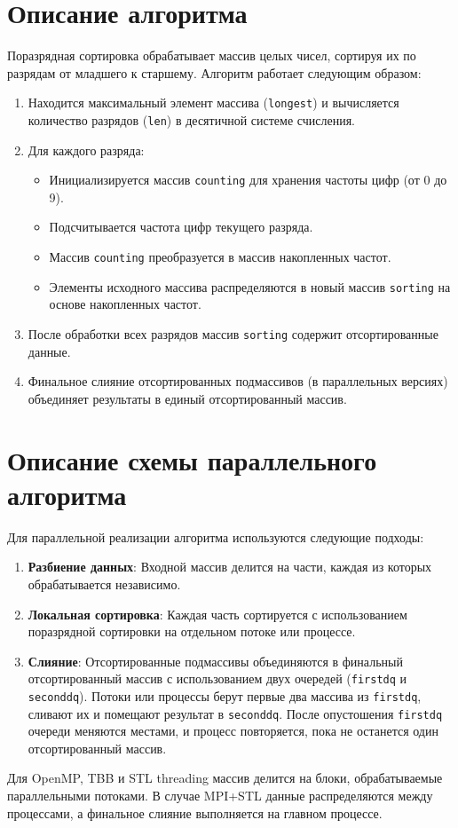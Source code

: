 \documentclass[a4paper,12pt]{article}
\begin{document}
\section{Описание алгоритма}
\sloppy
Поразрядная сортировка обрабатывает массив целых чисел, сортируя их по разрядам от младшего к старшему. Алгоритм работает следующим образом:
\begin{enumerate}
    \item Находится максимальный элемент массива (\texttt{longest}) и вычисляется количество разрядов (\texttt{len}) в десятичной системе счисления.
    \item Для каждого разряда:
        \begin{itemize}
            \item Инициализируется массив \texttt{counting} для хранения частоты цифр (от 0 до 9).
            \item Подсчитывается частота цифр текущего разряда.
            \item Массив \texttt{counting} преобразуется в массив накопленных частот.
            \item Элементы исходного массива распределяются в новый массив \texttt{sorting} на основе накопленных частот.
        \end{itemize}
    \item После обработки всех разрядов массив \texttt{sorting} содержит отсортированные данные.
    \item Финальное слияние отсортированных подмассивов (в параллельных версиях) объединяет результаты в единый отсортированный массив.
\end{enumerate}
\fussy

\section{Описание схемы параллельного алгоритма}
Для параллельной реализации алгоритма используются следующие подходы:
\begin{enumerate}
    \item \textbf{Разбиение данных}: Входной массив делится на части, каждая из которых обрабатывается независимо.
    \item \textbf{Локальная сортировка}: Каждая часть сортируется с использованием поразрядной сортировки на отдельном потоке или процессе.
    \item \textbf{Слияние}: Отсортированные подмассивы объединяются в финальный отсортированный массив с использованием двух очередей (\texttt{firstdq} и \texttt{seconddq}). Потоки или процессы берут первые два массива из \texttt{firstdq}, сливают их и помещают результат в \texttt{seconddq}. После опустошения \texttt{firstdq} очереди меняются местами, и процесс повторяется, пока не останется один отсортированный массив.
\end{enumerate}
Для OpenMP, TBB и STL threading массив делится на блоки, обрабатываемые параллельными потоками. В случае MPI+STL данные распределяются между процессами, а финальное слияние выполняется на главном процессе.
\end{document}
